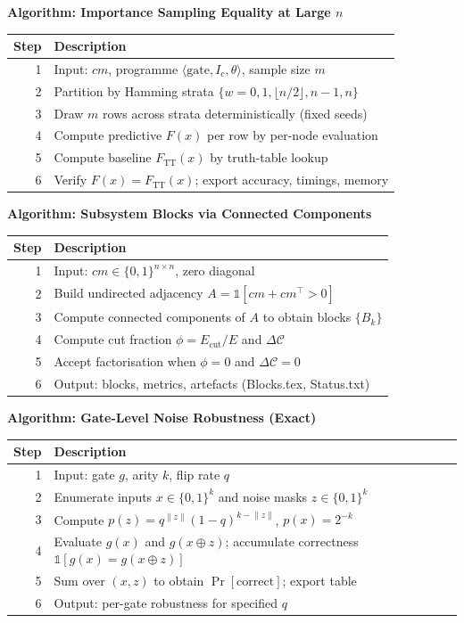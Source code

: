 \documentclass[11pt]{article}
\begin{document}
\textbf{Algorithm: Importance Sampling Equality at Large $n$}\\
\begin{center}
\begin{tabular}{rl}
\hline
Step & Description \\
\hline
1 & Input: $cm$, programme $\langle\text{gate}, I_c, \theta\rangle$, sample size $m$ \\
2 & Partition by Hamming strata $\{w=0,1,\lfloor n/2\rfloor,n-1,n\}$ \\
3 & Draw $m$ rows across strata deterministically (fixed seeds) \\
4 & Compute predictive $F(x)$ per row by per-node evaluation \\
5 & Compute baseline $F_{\mathrm{TT}}(x)$ by truth-table lookup \\
6 & Verify $F(x)=F_{\mathrm{TT}}(x)$; export accuracy, timings, memory \\
\hline
\end{tabular}
\end{center}

\textbf{Algorithm: Subsystem Blocks via Connected Components}\\
\begin{center}
\begin{tabular}{rl}
\hline
Step & Description \\
\hline
1 & Input: $cm\in\{0,1\}^{n\times n}$, zero diagonal \\
2 & Build undirected adjacency $A=\mathbb{1}[cm+cm^\top>0]$ \\
3 & Compute connected components of $A$ to obtain blocks $\{B_k\}$ \\
4 & Compute cut fraction $\phi=E_{\mathrm{cut}}/E$ and $\Delta\mathcal{C}$ \\
5 & Accept factorisation when $\phi=0$ and $\Delta\mathcal{C}=0$ \\
6 & Output: blocks, metrics, artefacts (Blocks.tex, Status.txt) \\
\hline
\end{tabular}
\end{center}

\textbf{Algorithm: Gate-Level Noise Robustness (Exact)}\\
\begin{center}
\begin{tabular}{rl}
\hline
Step & Description \\
\hline
1 & Input: gate $g$, arity $k$, flip rate $q$ \\
2 & Enumerate inputs $x\in\{0,1\}^k$ and noise masks $z\in\{0,1\}^k$ \\
3 & Compute $p(z)=q^{\lVert z\rVert}(1-q)^{k-\lVert z\rVert}$, $p(x)=2^{-k}$ \\
4 & Evaluate $g(x)$ and $g(x\oplus z)$; accumulate correctness $\mathbb{1}[g(x)=g(x\oplus z)]$ \\
5 & Sum over $(x,z)$ to obtain $\Pr[\text{correct}]$; export table \\
6 & Output: per-gate robustness for specified $q$ \\
\hline
\end{tabular}
\end{center}
\end{document}
